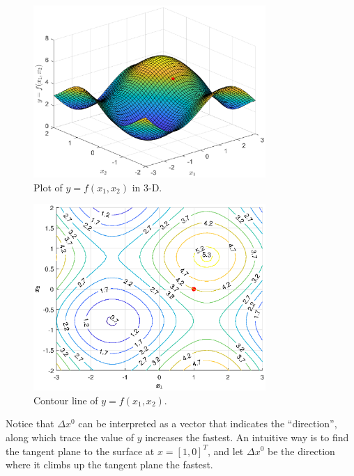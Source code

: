 \begin{figure}
	\centering
	\includegraphics[width=250pt]{chapters/chapter6/figures/gradientexp_3d.eps}
	\caption{Plot of $y=f(x_1, x_2)$ in 3-D.} \label{ch6fig:gradientexp_3d}
\end{figure}
\begin{figure}
	\centering
	\includegraphics[width=250pt]{chapters/chapter6/figures/gradientexp_contour.eps}
	\caption{Contour line of $y=f(x_1, x_2)$.} \label{ch6fig:gradientexp_contour}
\end{figure}

Notice that $\Delta x^0$ can be interpreted as a vector that indicates the ``direction'', along which trace the value of $y$ increases the fastest. An intuitive way is to find the tangent plane to the surface at $x=[1,0]^T$, and let $\Delta x^0$ be the direction where it climbs up the tangent plane the fastest. 

